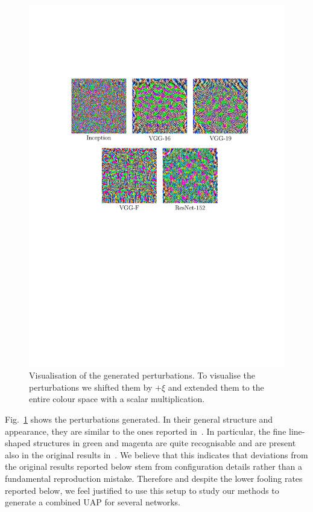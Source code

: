 \documentclass[runningheads]{llncs}
\begin{document}
\begin{figure}[ht]
	\centering
	\includegraphics[clip, trim=3.8cm 12.8cm 2.8cm 5.8cm, width=1.0\textwidth]{plots_generierung/perturbationsFigure.pdf}
	\caption{Visualisation of the generated perturbations. To visualise the perturbations we shifted them by $+\xi$ and extended them to the entire colour space with a scalar multiplication.}\label{fig_stoerwerte}
\end{figure}

Fig.~\ref{fig_stoerwerte} shows the perturbations generated. In their general structure and appearance, they are similar to the ones reported in~\cite{moosavidezfooli_universal_2017}. In particular, the fine line-shaped structures in green and magenta are quite recognisable and are present also in the original results in~\cite{moosavidezfooli_universal_2017}. We believe that this indicates that deviations from the original results reported below stem from configuration details rather than a fundamental reproduction mistake. Therefore and despite the lower fooling rates reported below, we feel justified to use this setup to study our methods to generate a combined UAP for several networks. 
\end{document}
